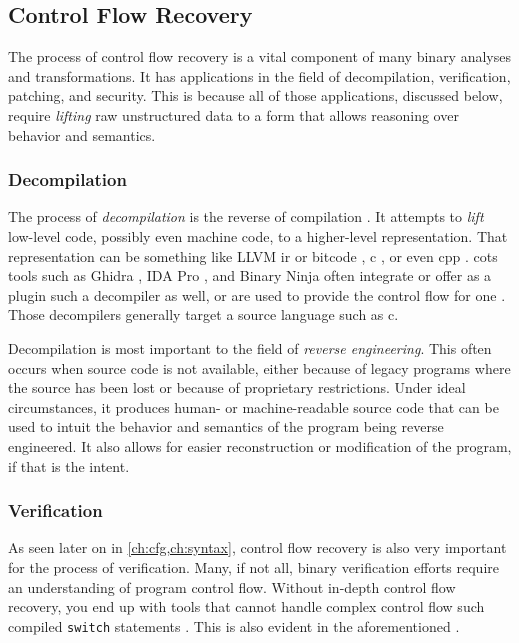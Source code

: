 \subsection{Control Flow Recovery}
The process of control flow recovery is a vital component of many binary analyses and transformations. It has applications in the field of decompilation, verification, patching, and security.
This is because all of those applications, discussed below, require \emph{lifting} raw unstructured data to a form that allows reasoning over behavior and semantics.

\subsubsection{Decompilation}
The process of \emph{decompilation} is the reverse of compilation .
It attempts to \emph{lift} low-level code, possibly even machine code, to a higher-level representation.
That representation can be something like LLVM \ac{ir} or bitcode \autocite{dinaburg2014mcsema}, \gls{c} \autocite{brumley2013native}, or even \gls{cpp} \autocite{fokin2011smartdec}.
\Ac{cots} tools such as Ghidra \autocite{ghidra}, IDA Pro \autocite{ida-decompiler}, and Binary Ninja \autocite{binary-ninja-decompiler} often integrate or offer as a plugin such a decompiler as well, or are used to provide the control flow for one \autocite{mcsema}.
Those decompilers generally target a source language such as \gls{c}.

Decompilation is most important to the field of \emph{reverse engineering}.
This often occurs when source code is not available, either because of legacy programs where the source has been lost or because of proprietary restrictions.
Under ideal circumstances, it produces human- or machine-readable source code that can be used to intuit the behavior and semantics of the program being reverse engineered.
It also allows for easier reconstruction or modification of the program, if that is the intent.

\subsubsection{Verification}
As seen later on in \cref{ch:cfg,ch:syntax}, control flow recovery is also very important for the process of verification.
Many, if not all, binary verification efforts require an understanding of program control flow.
Without in-depth control flow recovery, you end up with tools that cannot handle complex control flow such compiled \lstinline|switch| statements \autocite{myreen2008dil,tan2015auspice}.
This is also evident in the aforementioned .

